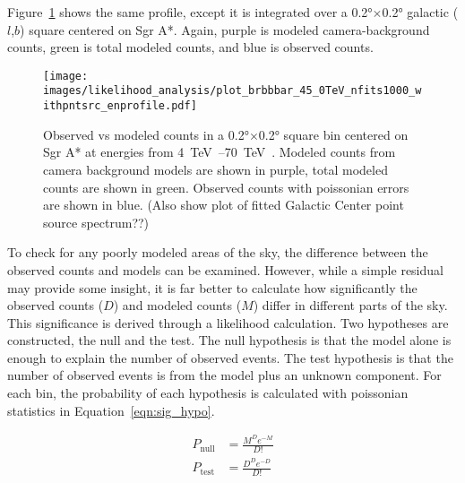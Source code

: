   Figure~\ref{fig:gc_profile_energy} shows the same profile, except it is integrated over a \ang{0.2}$\times$\ang{0.2} galactic ($l$,$b$) square centered on Sgr A*.
  Again, purple is modeled camera-background counts, green is total modeled counts, and blue is observed counts.
  
  \begin{figure}[h]
    \centering
    \texttt{[image: images/likelihood\_analysis/plot\_brbbbar\_45\_0TeV\_nfits1000\_withpntsrc\_enprofile.pdf]}
    \caption[Galactic Center Profile vs Energy]{
      Observed vs modeled counts in a \ang{0.2}$\times$\ang{0.2} square bin centered on Sgr A* at energies from \SIrange{4}{70}{\TeV{}}.
      Modeled counts from camera background models are shown in purple, total modeled counts are shown in green.
      Observed counts with poissonian errors are shown in blue.
      {\color{red}(Also show plot of fitted Galactic Center point source spectrum??)}
      }
    \label{fig:gc_profile_energy}
  \end{figure}
  
  To check for any poorly modeled areas of the sky, the difference between the observed counts and models can be examined.
  However, while a simple residual may provide some insight, it is far better to calculate how significantly the observed counts ($D$) and modeled counts ($M$) differ in different parts of the sky.
  This significance is derived through a likelihood calculation.
  Two hypotheses are constructed, the null and the test.
  The null hypothesis is that the model alone is enough to explain the number of observed events.
  The test hypothesis is that the number of observed events is from the model plus an unknown component.
  For each bin, the probability of each hypothesis is calculated with poissonian statistics in Equation~\ref{eqn:sig_hypo}.

  \begin{equation}\label{eqn:sig_hypo}
    \begin{split}
      P_{\textrm{null}} & = \frac{M^{D} e^{-M}}{D!} \\
      P_{\textrm{test}} & = \frac{D^{D} e^{-D}}{D!} \\
    \end{split}
  \end{equation}
  
